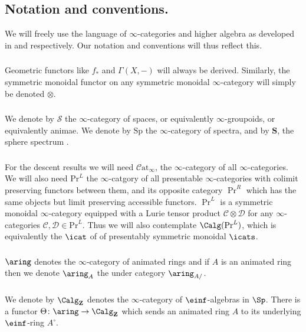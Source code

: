 \documentclass[10pt,reqno]{amsart}
\numberwithin{equation}{section}
\newcommand{\cD}{{\mathcal{D}}}
\newcommand{\cC}{\mathcal{C}}
\newcommand{\catinf}{\mathcal{C}\mathrm{at}_\infty}
\newcommand{\ZZ}{\mathbf{Z}}
\begin{document}
\subsection{Notation and conventions.}\label{notations and conventions}
We will freely use the language of $\infty$-categories and higher algebra as developed in  \cite{HTT} and \cite{HA} respectively. Our notation and conventions will thus reflect this. 

\subsubsection{}Geometric functors like $f_*$ and $\Gamma(X,-)$ will always be derived. Similarly, the symmetric monoidal functor on any symmetric monoidal $\infty$-category will simply be denoted $\otimes$.

\subsubsection{}We denote by $\mathcal{S}$ the $\infty$-category of spaces, or equivalently $\infty$-groupoids, or equivalently animae. We denote by $\mathrm{Sp}$ the $\infty$-category of spectra, and by $\mathbf{S}$, the sphere spectrum .


\subsubsection{} \label{infty nonsense}For the descent results we will need $\catinf$, the $\infty$-category of all $\infty$-categories. We will also need $\mathrm{Pr}^L$ the $\infty$-catgory of all presentable $\infty$-categories with colimit preserving functors between them, and its opposite category $\Pr^R$ which has the same objects but limit preserving accessible functors. $\Pr^L$ is a symmetric monoidal $\infty$-category equipped with a Lurie tensor product $\cC\otimes \cD$ for any $\infty$-categories $\cC, \cD\in \mathrm{Pr}^L.$  Thus we will also contemplate $\Calg(\Pr^L)$, which is equivalently the $\icat$ of of presentably symmetric monoidal $\icats$.



\subsubsection{} $\aring$ denotes the $\infty$-category of animated rings and if $A$ is an animated ring then we denote $\aring_A$ the under category  $\aring_{A/}$. 

\subsubsection{}\label{forgetful} We denote by $\Calg_\ZZ$ denotes the $\infty$-category of $\einf$-algebras in $\Sp$. There is a functor $\Theta\colon \aring\to \Calg_\ZZ$ which sends an animated ring $A$ to its underlying $\einf$-ring $A^\circ.$ 
\end{document}
